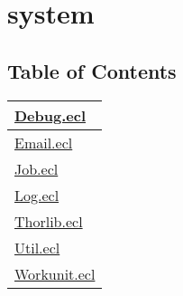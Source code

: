 \chapter*{system}
\hypertarget{ecldoc:toc:system}{}


\section*{Table of Contents}
{\renewcommand{\arraystretch}{1.5}
\begin{longtable}{|p{\textwidth}|}
\hline
\hyperlink{ecldoc:toc:system.Debug}{Debug.ecl} \\
\hline
\hyperlink{ecldoc:toc:system.Email}{Email.ecl} \\
\hline
\hyperlink{ecldoc:toc:system.Job}{Job.ecl} \\
\hline
\hyperlink{ecldoc:toc:system.Log}{Log.ecl} \\
\hline
\hyperlink{ecldoc:toc:system.Thorlib}{Thorlib.ecl} \\
\hline
\hyperlink{ecldoc:toc:system.Util}{Util.ecl} \\
\hline
\hyperlink{ecldoc:toc:system.Workunit}{Workunit.ecl} \\
\hline
\end{longtable}
}








